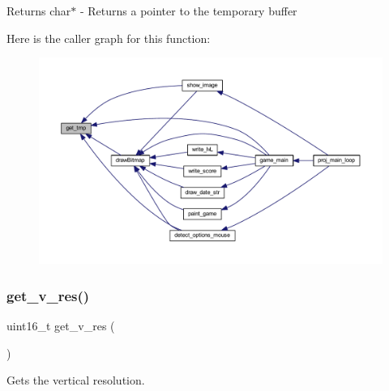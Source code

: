 \begin{DoxyReturn}{Returns}
char$\ast$ -\/ Returns a pointer to the temporary buffer 
\end{DoxyReturn}
Here is the caller graph for this function\+:
\nopagebreak
\begin{figure}[H]
\begin{center}
\leavevmode
\includegraphics[width=350pt]{group__videog_gae16576a0c83561a7c462fb76956e06dc_icgraph}
\end{center}
\end{figure}
\mbox{\label{group__videog_ga8ecfc1971f8bce697d1e02ebf57e6801}} 
\subsubsection{\texorpdfstring{get\+\_\+v\+\_\+res()}{get\_v\_res()}}
{\footnotesize\ttfamily uint16\+\_\+t get\+\_\+v\+\_\+res (\begin{DoxyParamCaption}{ }\end{DoxyParamCaption})}



Gets the vertical resolution. 

